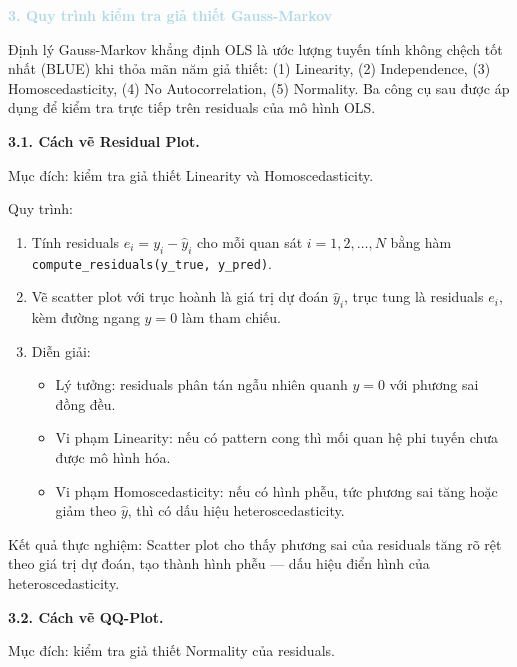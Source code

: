 \vspace{0.5em}
\noindent\textcolor{lightblue}{\textbf{3. Quy trình kiểm tra giả thiết Gauss-Markov}}
\vspace{0.5em}

Định lý Gauss-Markov khẳng định OLS là ước lượng tuyến tính không chệch tốt nhất (BLUE) khi thỏa mãn năm giả thiết: (1) Linearity, (2) Independence, (3) Homoscedasticity, (4) No Autocorrelation, (5) Normality. Ba công cụ sau được áp dụng để kiểm tra trực tiếp trên residuals của mô hình OLS.

\textbf{3.1. Cách vẽ Residual Plot.}

Mục đích: kiểm tra giả thiết Linearity và Homoscedasticity.

Quy trình:
\begin{enumerate}
    \item Tính residuals $e_i = y_i - \hat{y}_i$ cho mỗi quan sát $i = 1, 2, \ldots, N$ bằng hàm \texttt{compute\_residuals(y\_true, y\_pred)}.

    \item Vẽ scatter plot với trục hoành là giá trị dự đoán $\hat{y}_i$, trục tung là residuals $e_i$, kèm đường ngang $y = 0$ làm tham chiếu.

    \item Diễn giải:
    \begin{itemize}
        \item Lý tưởng: residuals phân tán ngẫu nhiên quanh $y = 0$ với phương sai đồng đều.
        \item Vi phạm Linearity: nếu có pattern cong thì mối quan hệ phi tuyến chưa được mô hình hóa.
        \item Vi phạm Homoscedasticity: nếu có hình phễu, tức phương sai tăng hoặc giảm theo $\hat{y}$, thì có dấu hiệu heteroscedasticity.
    \end{itemize}
\end{enumerate}

Kết quả thực nghiệm: Scatter plot cho thấy phương sai của residuals tăng rõ rệt theo giá trị dự đoán, tạo thành hình phễu --- dấu hiệu điển hình của heteroscedasticity.

\textbf{3.2. Cách vẽ QQ-Plot.}

Mục đích: kiểm tra giả thiết Normality của residuals.

